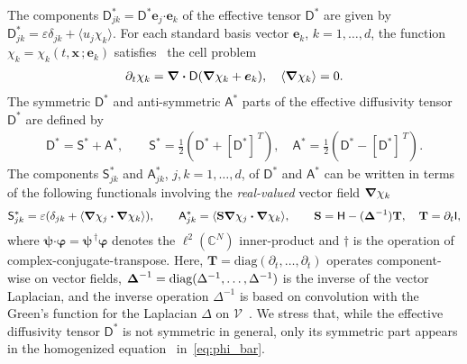 \documentclass[leqno,onefignum,onetabnum]{siamltex1213}
\newcommand{\Tb}{\mathbf{T}}
\newcommand{\Sb}{\mathbf{S}}
\newcommand{\Vc}{\mathcal{V}}
\newcommand{\Dm}{\mathsf{D}}
\newcommand{\Hm}{\mathsf{H}}
\newcommand{\Sm}{\mathsf{S}}
\newcommand{\Am}{\mathsf{A}}
\newcommand{\Ib}{\mathsf{I}}
\newcommand\bDelta{\mbox{\boldmath${\Delta}$}}
\newcommand\bnabla{\mbox{\boldmath${\nabla}$}}
\providecommand\bcdot{\boldsymbol{\cdot}}
\newcommand{\vecx}{\boldsymbol{x}}
\newcommand{\vece}{\boldsymbol{e}}
\newcommand{\vecpsi}{\boldsymbol{\psi}}
\newcommand{\vecvarphi}{\boldsymbol{\varphi}}
\begin{document}
The components $\Dm^*_{jk}=\Dm^*\vece _j\bcdot\vece _k$ of the effective
tensor $\Dm^*$ are given by $\Dm^*_{jk}=\varepsilon\delta_{jk}+\langle u_j\chi_k\rangle$. For each
standard basis vector $\vece _k$, $k=1,\ldots,d$, the function
$\chi_k=\chi_k(t,\vecx\,;\vece _k)$ satisfies~\cite{Fannjiang:SIAM_JAM:333}
the cell problem     
% 
\begin{align}%
  \partial_t\chi_k=\bnabla \bcdot\Dm(\bnabla \chi_k+\vece_k), \quad
  \langle\bnabla \chi_k\rangle=0.
\end{align}
%
 The symmetric $\Dm^*$ and
anti-symmetric $\Am^*$ parts of the effective diffusivity tensor
$\Dm^*$ are defined by 
%
\begin{align}%
  \Dm^*=\Sm^*+\Am^*,\qquad
  \Sm^*=\frac{1}{2}\left(\Dm^*+[\Dm^*]^{\,T}\right), \quad
  \Am^*=\frac{1}{2}\left(\Dm^*-[\Dm^*]^{\,T}\right).
\end{align}
%
The components $\Sm^*_{jk}$ and $\Am^*_{jk}$, $j,k=1,\ldots,d$, of $\Dm^*$
and $\Am^*$ can be written in terms of the following functionals
involving the \emph{real-valued} vector field $\bnabla \chi_k$
%
\begin{align}%
 \Sm^*_{jk}=\varepsilon(\delta_{jk}+\langle\bnabla \chi_j\bcdot\bnabla \chi_k\rangle), \qquad
 \Am^*_{jk}=\langle\Sb\bnabla \chi_j\bcdot\bnabla \chi_k\rangle, \qquad
 \Sb=\Hm-(\bDelta^{-1})\Tb, \quad \Tb=\partial_t\Ib,
\end{align}
%
where $\vecpsi\bcdot\vecvarphi=\vecpsi^{\,\dagger}\vecvarphi$ denotes the
$\ell^2(\mathbb{C}^N)$ inner-product and $\dagger$ is the operation of
complex-conjugate-transpose.  
Here, $\Tb=\text{diag}(\partial_t,\ldots,\partial_t)$ operates component-wise on vector
fields, $\bDelta^{-1}=\text{diag}(\Delta^{-1},\ldots,\Delta^{-1})$ is the inverse of
the vector Laplacian, and the inverse operation $\Delta^{-1}$ is based on
convolution with the Green's function for the Laplacian $\Delta$ on
$\Vc$~\cite{Stakgold:BVP:2000}.  We stress that, while the effective diffusivity tensor $\Dm^*$ is not symmetric in general, only its
symmetric part appears in the homogenized
equation~\cite{McLaughlin:SIAM_JAM:780} in~\eqref{eq:phi_bar}.   
\end{document}
